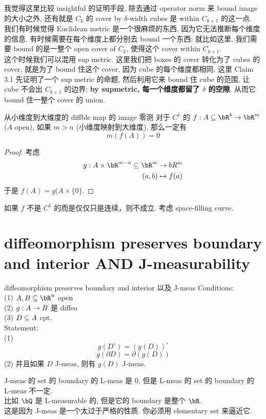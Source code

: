 \documentclass[lang=cn,11pt]{elegantbook}
\begin{document}
\begin{remark}
我觉得这里比较 insightful 的证明手段, 除去通过 operator norm 来 bound image 的大小之外, 还有就是 $C_k$ 的 cover by $\delta$-width cubes 是 within $C_{k+1}$ 的这一点. \\
我们有时候觉得 Euclidean metric 是一个很麻烦的东西, 因为它无法推断每个维度的信息. 有时候需要在每个维度上都分别去 bound 一个东西: 就比如这里, 我们需要 bound 的是一整个 open cover of $C_k$, 使得这个 cover within $C_{k+1}$.\\
这个时候我们可以混用 sup metric. 这里我们把 boxes 的 cover 转化为了 cubes 的 cover, 就是为了 bound 住这个 cover, 因为 cube 的每个维度都相同. 这里 Claim 3.1 先证明了一个 sup metric 的命题, 然后利用它来 bound 住 cube 的范围, 让 cube 不会出 $C_{k+1}$ 的边界: \textbf{by supmetric, 每一个维度都留了 $\delta$ 的空隙}. 从而它 bound 住一整个 cover 的 union. 
\end{remark}





\begin{corollary}{从小维度到大维度的 diffble map 的 image 零测}
    对于 $C^1$ 的 $f: A \sub \bR^b \rar \bR^m $($A$ open), 如果 $m > n$ (小维度映射到大维度), 那么一定有 
    $$
    m(f(A)) = 0
    $$
\end{corollary}
\begin{proof}
    考虑
    \begin{align}
        g: A \times \bR^{m-n} \sub \bR^m &\rar bR^m\\
        (a,b) & \mapsto f(a)
    \end{align}
    于是 $f(A) = g(A \times \{0\}$.
\end{proof}
\begin{remark}
    如果 $f$ 不是 $C^1$ 的而是仅仅只是连续，则不成立. 考虑 space-filling curve.\\
\end{remark}


\section{diffeomorphism preserves boundary and interior AND J-measurability}
\begin{theorem}{diffeomorphism preserves boundary and interior 以及 J-meas}
Conditions:\\
(1) $A,B \sub \bR^n$ open\\
(2) $g: A \rightarrow B$ 是 diffeo\\
(3) $D \subseteq A$ cpt.\\
Statement:\\
(1) 
$$
g(D^{\circ}) = (g(D))^{\circ}
$$
$$
g(\partial D) = \partial(g(D))
$$
(2) 并且如果 $D$ J-meas, 则有 $g(D)$ J-meas.
\end{theorem}
\begin{remark}
    J-meas 的 set 的 boundary 的 L-meas 是 0, 但是 L-meas 的 set 的 boundary 的 L-meas 不一定.\\
    比如 $\bQ$ 是 L-measurable 的, 但是它的 boundary 是整个 $\bR$.\\
    这是因为 J-meas 是一个太过于严格的性质. 你必须用 elementary set 来逼近它. 
\end{remark}
\end{document}
